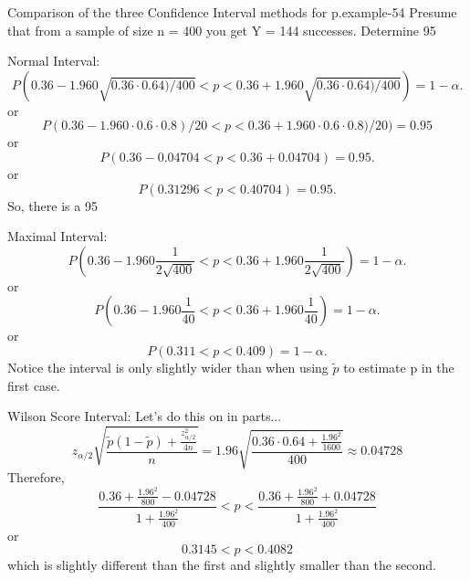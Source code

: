 \documentclass[10pt,]{book}
\numberwithin{equation}{section}
\newcommand{\lt}{<}
\begin{document}
 \begin{example}{Comparison of the three Confidence Interval methods for p.}{example-54}%
\hypertarget{p-1354}{}%
Presume that from a sample of size n = 400 you get Y = 144 successes.  Determine 95%
\par
\hypertarget{p-1355}{}%
Normal Interval:%
\begin{equation*}
P( 0.36 - 1.960 \sqrt{0.36 \cdot 0.64) / 400} \lt  p \lt 0.36 + 1.960 \sqrt{0.36 \cdot 0.64) / 400}) = 1 - \alpha.
\end{equation*}
or%
\begin{equation*}
P( 0.36 - 1.960 \cdot 0.6 \cdot 0.8) / 20 \lt  p \lt 0.36 + 1.960 \cdot 0.6 \cdot 0.8) / 20) = 0.95 
\end{equation*}
or%
\begin{equation*}
P( 0.36 - 0.04704 \lt  p \lt 0.36 + 0.04704) = 0.95 .
\end{equation*}
or%
\begin{equation*}
P( 0.31296 \lt  p \lt 0.40704) = 0.95 .
\end{equation*}
So, there is a 95%
\par
\hypertarget{p-1356}{}%
Maximal Interval:%
\begin{equation*}
P( 0.36 - 1.960 \frac{1}{2\sqrt{400}} \lt  p \lt 0.36 + 1.960 \frac{1}{2\sqrt{400}} ) = 1 - \alpha.
\end{equation*}
or%
\begin{equation*}
P( 0.36 - 1.960 \frac{1}{40} \lt  p \lt 0.36 + 1.960 \frac{1}{40} ) = 1 - \alpha.
\end{equation*}
or%
\begin{equation*}
P( 0.311 \lt  p \lt 0.409 ) = 1 - \alpha.
\end{equation*}
Notice the interval is only slightly wider than when using \(\tilde{p}\) to estimate p in the first case.%
\par
\hypertarget{p-1357}{}%
Wilson Score Interval:  Let's do this on in parts...%
\begin{equation*}
z_{\alpha/2} \sqrt{\frac{\tilde{p}(1-\tilde{p}) + \frac{z_{\alpha/2}^2}{4n}}{n}} = 1.96 \sqrt{ \frac{0.36 \cdot 0.64 + \frac{1.96^2}{1600}}{400}} \approx 0.04728
\end{equation*}
Therefore,%
\begin{equation*}
\frac{0.36 + \frac{1.96^2}{800} - 0.04728}{1 + \frac{1.96^2}{400}} \lt p \lt \frac{0.36 + \frac{1.96^2}{800} + 0.04728}{1 + \frac{1.96^2}{400}}
\end{equation*}
or%
\begin{equation*}
0.3145 \lt p \lt 0.4082
\end{equation*}
which is slightly different than the first and slightly smaller than the second.%
\end{example}
\end{document}
